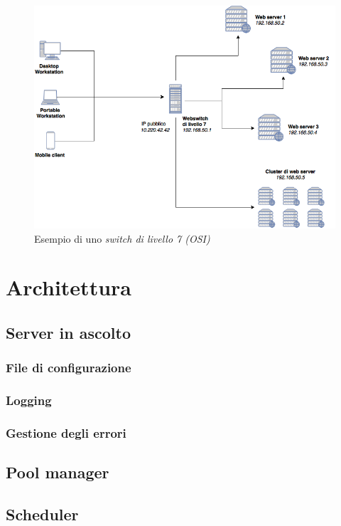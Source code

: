 \documentclass[italian]{tktltiki2}
\begin{document}
\begin{figure}
\centering
\includegraphics[width=\textwidth]{images/switch7}
\caption{Esempio di uno \emph{switch di livello 7 (OSI)}}
\end{figure}


\newpage
\section{Architettura}

\subsection{Server in ascolto}
\subsubsection{File di configurazione}
\subsubsection{Logging}
\subsubsection{Gestione degli errori}

\subsection{Pool manager}

\subsection{Scheduler}
\end{document}

